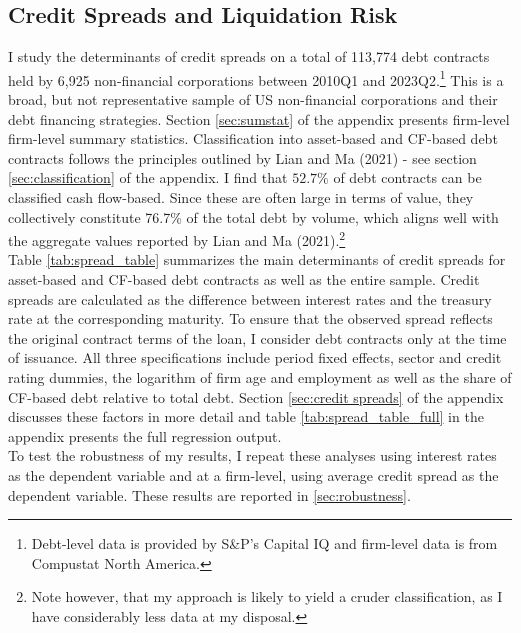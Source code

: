 \documentclass[12pt]{article}
\begin{document}
\subsection{Credit Spreads and Liquidation Risk \label{sec:emp liqrisk}} 

I study the determinants of credit spreads on a total of 113,774 debt contracts held by 6,925 non-financial corporations between 2010Q1 and 2023Q2.\footnote{Debt-level data is provided by S\&P's Capital IQ and firm-level data is from Compustat North America.} This is a broad, but not representative sample of US non-financial corporations and their debt financing strategies. Section \ref{sec:sumstat} of the appendix presents firm-level firm-level summary statistics. Classification into asset-based and CF-based debt contracts follows the principles outlined by Lian and Ma (2021) - see section \ref{sec:classification} of the appendix. I find that $52.7\%$ of debt contracts can be classified cash flow-based. Since these are often large in terms of value, they collectively constitute 76.7\% of the total debt by volume, which aligns well with the aggregate values reported by Lian and Ma (2021).\footnote{Note however, that my approach is likely to yield a cruder classification, as I have considerably less data at my disposal.}   \vspace{3mm} \\ 
Table \ref{tab:spread_table} summarizes the main determinants of credit spreads for asset-based and CF-based debt contracts as well as the entire sample. Credit spreads are calculated as the difference between interest rates and the treasury rate at the corresponding maturity. To ensure that the observed spread reflects the original contract terms of the loan, I consider debt contracts only at the time of issuance. All three specifications include period fixed effects, sector and credit rating dummies, the logarithm of firm age and employment as well as the share of CF-based debt relative to total debt. Section \ref{sec:credit spreads} of the appendix discusses these factors in more detail and table \ref{tab:spread_table_full} in the appendix presents the full regression output. \vspace{3mm} \\
To test the robustness of my results, I repeat these analyses using interest rates as the dependent variable and at a firm-level, using average credit spread as the dependent variable. These results are reported in \ref{sec:robustness}. 
\end{document}
